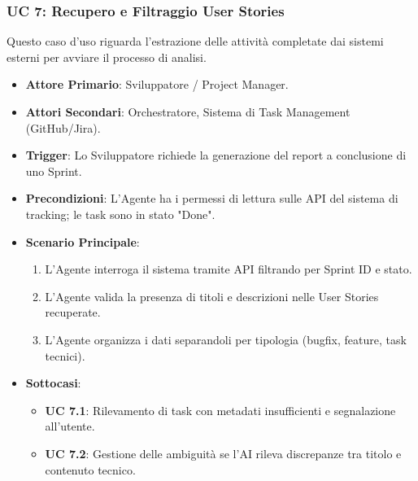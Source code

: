\documentclass[12pt, a4paper]{article}
\begin{document}
\subsubsection{UC 7: Recupero e Filtraggio User Stories}
Questo caso d'uso riguarda l'estrazione delle attività completate dai sistemi esterni per avviare il processo di analisi.
\begin{itemize}
\item \textbf{Attore Primario}: Sviluppatore / Project Manager.
\item \textbf{Attori Secondari}: Orchestratore, Sistema di Task Management (GitHub/Jira).
\item \textbf{Trigger}: Lo Sviluppatore richiede la generazione del report a conclusione di uno Sprint.
\item \textbf{Precondizioni}: L'Agente ha i permessi di lettura sulle API del sistema di tracking; le task sono in stato "Done".
\item \textbf{Scenario Principale}:
\begin{enumerate}
\item L'Agente interroga il sistema tramite API filtrando per Sprint ID e stato.
\item L'Agente valida la presenza di titoli e descrizioni nelle User Stories recuperate.
\item L'Agente organizza i dati separandoli per tipologia (bugfix, feature, task tecnici).
\end{enumerate}
\item \textbf{Sottocasi}:
\begin{itemize}
\item \textbf{UC 7.1}: Rilevamento di task con metadati insufficienti e segnalazione all'utente.
\item \textbf{UC 7.2}: Gestione delle ambiguità se l'AI rileva discrepanze tra titolo e contenuto tecnico.
\end{itemize}
\end{itemize}
\end{document}
